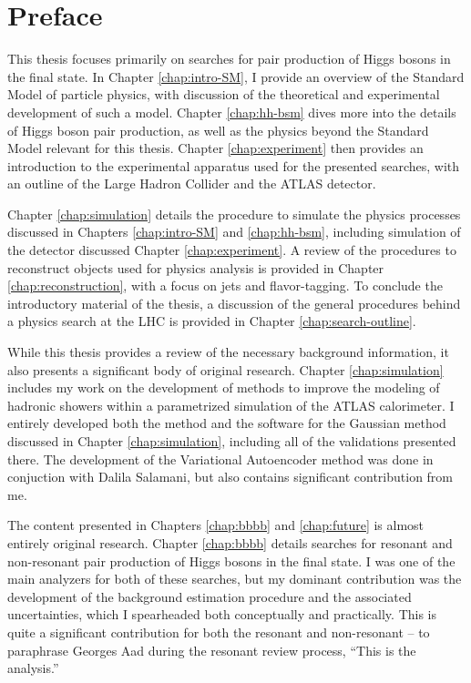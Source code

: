 \chapter*{Preface}      %

This thesis focuses primarily on searches for pair production of Higgs bosons in the \bbbb final state. 
In Chapter \ref{chap:intro-SM}, I provide an overview of the Standard Model of particle physics, with discussion 
of the theoretical and experimental development of such a model. Chapter \ref{chap:hh-bsm} dives more into the 
details of Higgs boson pair production, as well as the physics beyond the Standard Model relevant for 
this thesis. Chapter \ref{chap:experiment} then provides an introduction to the experimental apparatus used for 
the presented searches, with an outline of the Large Hadron Collider and the ATLAS detector. 

Chapter \ref{chap:simulation} details the procedure to simulate the physics processes discussed in 
Chapters \ref{chap:intro-SM} and \ref{chap:hh-bsm}, including simulation of the detector discussed Chapter \ref{chap:experiment}. 
A review of the procedures to reconstruct objects used for physics analysis is provided in 
Chapter \ref{chap:reconstruction}, with a focus on jets and flavor-tagging. To conclude the introductory material of 
the thesis, a discussion of the general procedures behind a physics search at the LHC is provided in 
Chapter \ref{chap:search-outline}.

While this thesis provides a review of the necessary background information, it also presents a significant body of 
original research. Chapter \ref{chap:simulation} includes my work on the development of methods to improve the modeling 
of hadronic showers within a parametrized simulation of the ATLAS calorimeter. I entirely developed both the method and 
the software for the Gaussian method discussed in Chapter \ref{chap:simulation}, including all of the validations 
presented there. The development of the Variational Autoencoder method was done in conjuction with Dalila Salamani, but 
also contains significant contribution from me.

The content presented in Chapters \ref{chap:bbbb} and \ref{chap:future} is almost entirely original research. 
Chapter \ref{chap:bbbb} details searches for resonant and non-resonant pair production of Higgs bosons in the \bbbb 
final state. I was one of the main analyzers for both of these searches, but my dominant contribution was the 
development of the background estimation procedure and the associated uncertainties, which I spearheaded both conceptually 
and practically. This is quite a significant contribution for both the resonant and non-resonant -- to paraphrase Georges 
Aad during the resonant review process, ``This is the analysis.''

